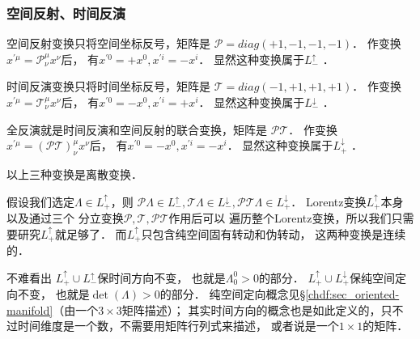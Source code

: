 \subsubsection{空间反射、时间反演} %
空间反射变换只将空间坐标反号，矩阵是
$\mathcal{P} = diag (+1,-1,-1,-1)$．
作变换$x^{\prime \mu}=\mathcal{P}^\mu _\nu x^{\nu}$后，
有$x^{\prime 0}=+x^0, x^{\prime i}= -x^i$．
显然这种变换属于$L^{\uparrow}_{-}$ ．

时间反演变换只将时间坐标反号，矩阵是
$\mathcal{T} = diag (-1,+1,+1,+1)$．
作变换$x^{\prime \mu}=\mathcal{T}^\mu _\nu x^{\nu}$后，
有$x^{\prime 0}=-x^0, x^{\prime i}= +x^i$．
显然这种变换属于$L^{\downarrow}_{-}$ ．

全反演就是时间反演和空间反射的联合变换，矩阵是
$\mathcal{PT}$．
作变换$x^{\prime \mu}=(\mathcal{PT})^\mu _\nu x^{\nu}$后，
有$x^{\prime 0}=-x^0, x^{\prime i}= -x^i$．
显然这种变换属于$L^{\downarrow}_{+}$ ．



以上三种变换是离散变换．

假设我们选定$\Lambda  \in  L^{\uparrow}_{+}$，则
$\mathcal{P}\Lambda  \in  L^{\uparrow}_{-},
\mathcal{T}\Lambda  \in  L^{\downarrow}_{-},
\mathcal{PT}\Lambda \in  L^{\downarrow}_{+}$．
Lorentz变换$L^{\uparrow}_{+}$本身以及通过三个
分立变换$\mathcal{P},\mathcal{T},\mathcal{PT}$作用后可以
遍历整个Lorentz变换，所以我们只需要研究$L^{\uparrow}_{+}$就足够了．
而$L^{\uparrow}_{+}$只包含纯空间固有转动和伪转动，
这两种变换是连续的．

不难看出 $L^{\uparrow}_{+}\cup L^{\uparrow}_{-}$保时间方向不变，
也就是$\Lambda^0_0 >0$的部分．
$L^{\uparrow}_{+}\cup L^{\downarrow}_{+}$保纯空间定向不变，
也就是$\det (\Lambda) >0$的部分．
纯空间定向概念见\S\ref{chdf:sec_oriented-manifold}（由一个$3\times 3$矩阵描述）；
其实时间方向的概念也是如此定义的，只不过时间维度是一个数，不需要用矩阵行列式来描述，
或者说是一个$1\times 1$的矩阵．

